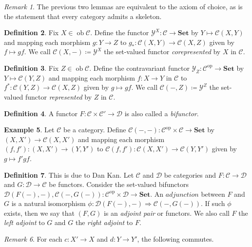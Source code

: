 \documentclass[10pt,letterpaper,cm]{nupset}
\theoremstyle{definition}
\newtheorem{definition}{Definition}
\newtheorem{exmp}[definition]{Example}
\theoremstyle{theorem}
\theoremstyle{remark}
\newtheorem{remark}[definition]{Remark}
\newcommand{\1}{\mathbf{1}}
\renewcommand{\c}{\mathscr{C}}
\renewcommand{\d}{\mathscr{D}}
\newcommand{\y}{\mathscr{Y}}
\newcommand{\0}{\vec 0}
\DeclareMathOperator{\op}{op}
\DeclareMathOperator{\ob}{ob}
\begin{document}
\begin{remark}
The previous two lemmas are equivalent to the axiom of choice, as is the statement that every category admits a skeleton.
\end{remark}

\begin{definition}
Fix $X \in \ob \c$. Define the functor $\y^X : \c \to \mathbf{Set}$ by $Y \mapsto \c(X, Y)$  and mapping each morphism $g: Y \to Z$ to $g_{\ast} : \c(X, Y) \to \c(X, Z)$ given by $f \mapsto gf$. We call $\c(X, -)\coloneqq\y^X$ the set-valued functor \textit{corepresented} by $X$ in $\c$.
\end{definition}

\begin{definition}
Fix $Z \in \ob \c$. Define the contravariant functor $\y_Z: \c^{\op} \to \mathbf{Set}$ by $Y \mapsto \c(Y, Z)$ and mapping each morphism $f: X \to Y$ in $\c$ to $f^{\ast} : \c(Y, Z) \to \c(X, Z)$ given by $g\mapsto gf$. We call $\c(-, Z)\coloneqq \y^Z$ the set-valued functor \textit{represented} by $Z$ in $\c$.
\end{definition}

\begin{definition}
A functor $F: \c \times \c' \to \d$ is also called a \textit{bifunctor}.
\end{definition}

\begin{exmp}
Let $\c$ be a category. Define $\c(-, -): \c^{\op} \times \c \to \mathbf{Set}$ by $(X, X') \to \c(X, X')$ and mapping each morphism $(f, f') : (X, X') \to (Y, Y')$ to $\c(f, f') : \c(X, X') \to \c(Y, Y')$ given by $g \mapsto f'gf$.
\end{exmp}

\begin{definition}
This is due to Dan Kan. Let $\c$ and $\d$ be categories and $F : \c \to \d$ and $G: \d \to \c$ be functors. Consider the set-valued bifunctors $ \d(F(-), -), \c(-, G(-)): \c^{\op} \times \d \to \mathbf{Set}$. An $\textit{adjunction}$ between $F$ and $G$ is a natural isomorphism $\phi : \d(F(-), -) \Rightarrow \c(-, G(-))$. If such $\phi$ exists, then we say that $(F, G)$ is an \textit{adjoint pair} or functors. We also call $F$ the \textit{left adjoint} to $G$ and $G$ the \textit{right adjoint} to $F$. 

\begin{remark}
For each $c: X' \to X$ and $d: Y \to Y'$, the following commutes.

\begin{center}
\end{center}

\end{remark}

\end{definition}
\end{document}
